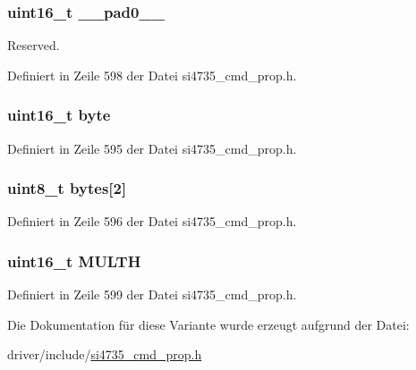 \subsubsection[{\+\_\+\+\_\+pad0\+\_\+\+\_\+}]{\setlength{\rightskip}{0pt plus 5cm}uint16\+\_\+t \+\_\+\+\_\+pad0\+\_\+\+\_\+}\label{unionfm__rsq__multi__hi__thres_a77132c2c26a75f5b8751b235cda23828}


Reserved. 



Definiert in Zeile 598 der Datei si4735\+\_\+cmd\+\_\+prop.\+h.

\hypertarget{unionfm__rsq__multi__hi__thres_ab0549c1b5ea980a02e7eab77e21fea49}{}
\subsubsection[{byte}]{\setlength{\rightskip}{0pt plus 5cm}uint16\+\_\+t byte}\label{unionfm__rsq__multi__hi__thres_ab0549c1b5ea980a02e7eab77e21fea49}


Definiert in Zeile 595 der Datei si4735\+\_\+cmd\+\_\+prop.\+h.

\hypertarget{unionfm__rsq__multi__hi__thres_a46e4c05d20a047ec169f60d3167e912e}{}
\subsubsection[{bytes}]{\setlength{\rightskip}{0pt plus 5cm}uint8\+\_\+t bytes\mbox{[}2\mbox{]}}\label{unionfm__rsq__multi__hi__thres_a46e4c05d20a047ec169f60d3167e912e}


Definiert in Zeile 596 der Datei si4735\+\_\+cmd\+\_\+prop.\+h.

\hypertarget{unionfm__rsq__multi__hi__thres_ae82179b893ce2b80c7dda73e56b83972}{}
\subsubsection[{M\+U\+L\+T\+H}]{\setlength{\rightskip}{0pt plus 5cm}uint16\+\_\+t M\+U\+L\+T\+H}\label{unionfm__rsq__multi__hi__thres_ae82179b893ce2b80c7dda73e56b83972}


Definiert in Zeile 599 der Datei si4735\+\_\+cmd\+\_\+prop.\+h.



Die Dokumentation für diese Variante wurde erzeugt aufgrund der Datei\+:\begin{DoxyCompactItemize}
\item 
driver/include/\hyperlink{si4735__cmd__prop_8h}{si4735\+\_\+cmd\+\_\+prop.\+h}\end{DoxyCompactItemize}
